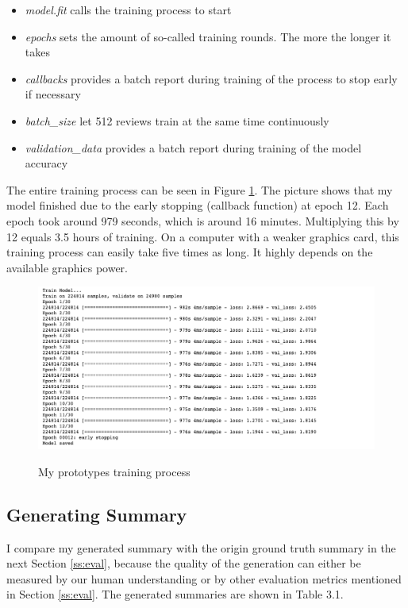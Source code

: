 \begin{itemize}
	\item \textit{model.fit} calls the training process to start 
	\item \textit{epochs} sets the amount of so-called training rounds. The more the longer it takes
	\item \textit{callbacks} provides a batch report during training of the process to stop early if necessary
	\item \textit{batch\_size} let 512 reviews train at the same time continuously
	\item \textit{validation\_data} provides a batch report during training of the model accuracy
\end{itemize}

The entire training process can be seen in Figure \ref{tpm}. The picture shows that my model finished due to the early stopping (callback function) at epoch 12. Each epoch took around 979 seconds, which is around 16 minutes. Multiplying this by 12 equals 3.5 hours of training. On a computer with a weaker graphics card, this training process can easily take five times as long. It highly depends on the available graphics power.

\begin{figure}
	\begin{center}
		\includegraphics[width=6.5in]{photos/training_process}\\
		\caption{My prototypes training process}\label{tpm}
	\end{center}
\end{figure}

\subsection{Generating Summary}

I compare my generated summary with the origin ground truth summary in the next Section \ref{ss:eval}, because the quality of the generation can either be measured by our human understanding or by other evaluation metrics mentioned in Section \ref{ss:eval}. The generated summaries are shown in Table 3.1.

